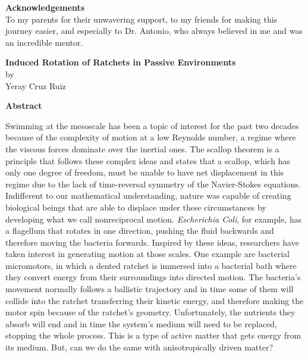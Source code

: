 \newpage %
\Huge {\bf Acknowledgements} \\
\vfill
\normalsize To my parents for their unwavering support, to my friends for making this journey easier, and especially to Dr. Antonio, who always believed in me and was an incredible mentor. 
\vfill

\vspace{5em}

\newpage %
\begin{center}
  \large {{\bf Induced Rotation of Ratchets in Passive Environments}\\
  by\\
Yeray Cruz Ruiz}
\end{center}
\Huge{{\bf Abstract}} \\
\normalsize
\vspace*{0em}

Swimming at the mesoscale has been a topic of interest for the past two decades because of the complexity of motion at a low Reynolds number, a regime where the viscous forces dominate over the inertial ones. The scallop theorem is a principle that follows these complex ideas and states that a scallop, which has only one degree of freedom, must be unable to have net displacement in this regime due to the lack of time-reversal symmetry of the Navier-Stokes equations. Indifferent to our mathematical understanding, nature was capable of creating biological beings that are able to displace under these circumstances by developing what we call nonreciprocal motion. \textit{Escherichia Coli}, for example, has a flagellum that rotates in one direction, pushing the fluid backwards and therefore moving the bacteria forwards. Inspired by these ideas, researchers have taken interest in generating motion at those scales. One example are bacterial micromotors, in which a dented ratchet is immersed into a bacterial bath where they convert energy from their surroundings into directed motion. The bacteria's movement normally follows a ballistic trajectory and in time some of them will collide into the ratchet transferring their kinetic energy, and therefore making the motor spin because of the ratchet's geometry. Unfortunately, the nutrients they absorb will end and in time the system's medium will need to be replaced, stopping the whole process. This is a type of active matter that gets energy from its medium. But, can we do the same with anisotropically driven matter?

